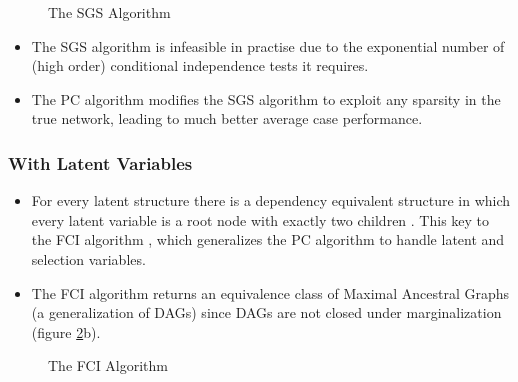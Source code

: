 \documentclass[20pt]{extreport}
\begin{document}
\begin{figure}
\caption{The SGS Algorithm}
\label{fig:SGS}
\centering
{}
\end{figure}

\begin{itemize}
\item The SGS algorithm is infeasible in practise due to the exponential number of (high order) conditional independence tests it requires. 
\item 
The PC algorithm \cite{Sprites} modifies the SGS algorithm to exploit any sparsity in the true network, leading to much better average case performance.
\end{itemize}

\subsubsection*{With Latent Variables}
\begin{itemize}
\item For every latent structure there is a dependency equivalent structure in which every latent variable is a root node with exactly two children \cite{Verma1993}. This key to the FCI algorithm \cite{Sprites}, which generalizes the PC algorithm to handle latent and selection variables. 

\item The FCI algorithm returns an equivalence class of Maximal Ancestral Graphs (a generalization of DAGs) since DAGs are not closed under marginalization (figure \ref{fig:FCI}b).
\end{itemize}


\newcommand{\imsize}{.70\columnwidth}

\begin{figure}
\caption{The FCI Algorithm}
\label{fig:FCI}
\centering
{}
\end{figure}
\end{document}
